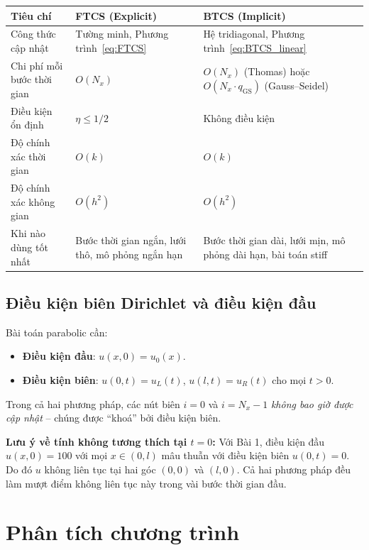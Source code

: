 \documentclass[12pt,a4paper]{article}
\begin{document}
\begin{center}
\small
\begin{tabular}{@{}p{4.3cm}p{5.8cm}p{5.2cm}@{}}
\toprule
\textbf{Tiêu chí} & \textbf{FTCS (Explicit)} & \textbf{BTCS (Implicit)} \\
\midrule
Công thức cập nhật & Tường minh, Phương trình~\eqref{eq:FTCS} & Hệ tridiagonal, Phương trình~\eqref{eq:BTCS_linear} \\
Chi phí mỗi bước thời gian & $O(N_x)$ & $O(N_x)$ (Thomas) hoặc $O(N_x \cdot q_{\text{GS}})$ (Gauss--Seidel) \\
Điều kiện ổn định & $\eta \le 1/2$ & Không điều kiện \\
Độ chính xác thời gian & $O(k)$ & $O(k)$ \\
Độ chính xác không gian & $O(h^2)$ & $O(h^2)$ \\
Khi nào dùng tốt nhất & Bước thời gian ngắn, lưới thô, mô phỏng ngắn hạn & Bước thời gian dài, lưới mịn, mô phỏng dài hạn, bài toán stiff \\
\bottomrule
\end{tabular}
\end{center}

\subsection{Điều kiện biên Dirichlet và điều kiện đầu}

Bài toán parabolic cần:
\begin{itemize}
    \item \textbf{Điều kiện đầu}: $u(x, 0) = u_0(x)$.
    \item \textbf{Điều kiện biên}: $u(0, t) = u_L(t)$, $u(l, t) = u_R(t)$ cho mọi $t > 0$.
\end{itemize}

Trong cả hai phương pháp, các nút biên $i = 0$ và $i = N_x - 1$ \emph{không bao giờ được cập nhật} -- chúng được ``khoá'' bởi điều kiện biên.

\textbf{Lưu ý về tính không tương thích tại $t = 0$:} Với Bài 1, điều kiện đầu $u(x, 0) = 100$ với mọi $x \in (0, l)$ mâu thuẫn với điều kiện biên $u(0, t) = 0$. Do đó $u$ không liên tục tại hai góc $(0, 0)$ và $(l, 0)$. Cả hai phương pháp đều làm mượt điểm không liên tục này trong vài bước thời gian đầu.

\section{Phân tích chương trình}
\end{document}
